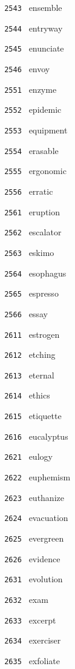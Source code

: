 \documentclass[11pt]{article}
\begin{document}
\begin{multicols}{6}
\noindent \texttt{ 2543 } ensemble  \par
\noindent \texttt{ 2544 } entryway  \par
\noindent \texttt{ 2545 } enunciate  \par
\noindent \texttt{ 2546 } envoy  \par
\noindent \texttt{ 2551 } enzyme  \par
\noindent \texttt{ 2552 } epidemic  \par
\noindent \texttt{ 2553 } equipment  \par
\noindent \texttt{ 2554 } erasable  \par
\noindent \texttt{ 2555 } ergonomic  \par
\noindent \texttt{ 2556 } erratic  \par
\noindent \texttt{ 2561 } eruption  \par
\noindent \texttt{ 2562 } escalator  \par
\noindent \texttt{ 2563 } eskimo  \par
\noindent \texttt{ 2564 } esophagus  \par
\noindent \texttt{ 2565 } espresso  \par
\noindent \texttt{ 2566 } essay  \par
\noindent \texttt{ 2611 } estrogen  \par
\noindent \texttt{ 2612 } etching  \par
\noindent \texttt{ 2613 } eternal  \par
\noindent \texttt{ 2614 } ethics  \par
\noindent \texttt{ 2615 } etiquette  \par
\noindent \texttt{ 2616 } eucalyptus  \par
\noindent \texttt{ 2621 } eulogy  \par
\noindent \texttt{ 2622 } euphemism  \par
\noindent \texttt{ 2623 } euthanize  \par
\noindent \texttt{ 2624 } evacuation  \par
\noindent \texttt{ 2625 } evergreen  \par
\noindent \texttt{ 2626 } evidence  \par
\noindent \texttt{ 2631 } evolution  \par
\noindent \texttt{ 2632 } exam  \par
\noindent \texttt{ 2633 } excerpt  \par
\noindent \texttt{ 2634 } exerciser  \par
\noindent \texttt{ 2635 } exfoliate  \par

\end{multicols}
\end{document}
